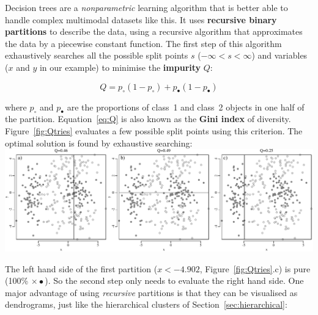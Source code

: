 Decision trees are a \textit{nonparametric} learning algorithm that is
better able to handle complex multimodal datasets like this. It uses
\textbf{recursive binary partitions} to describe the data, using a
recursive algorithm that approximates the data by a piecewise constant
function. The first step of this algorithm exhaustively searches all
the possible split points $s$ ($-\infty < s < \infty$) and variables
($x$ and $y$ in our example) to minimise the \textbf{impurity} $Q$:

\begin{equation}
  Q = p_{\circ} (1-p_{\circ}) + p_{\bullet} (1-p_{\bullet})
  \label{eq:Q}
\end{equation}

\noindent where $p_{\circ}$ and $p_{\bullet}$ are the proportions of
class~1 and class~2 objects in one half of the partition.
Equation~\ref{eq:Q} is also known as the \textbf{Gini index} of
diversity.  Figure~\ref{fig:Qtries} evaluates a few possible split
points using this criterion.  The optimal solution is found by
exhaustive searching:\\

\noindent\includegraphics[width=\textwidth]{../figures/Qtries.pdf}
\begingroup {}
\label{fig:Qtries}
\endgroup

The left hand side of the first partition ($x<-4.902$,
Figure~\ref{fig:Qtries}.c) is pure (100\% $\times\bullet$). So the
second step only needs to evaluate the right hand side. One major
advantage of using \textit{recursive} partitions is that they can be
visualised as dendrograms, just like the hierarchical clusters of
Section~\ref{sec:hierarchical}:\\

